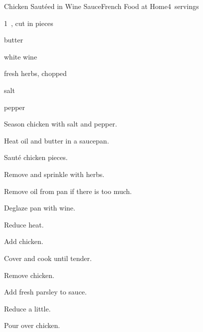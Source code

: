\begin{recipe}{Chicken Sautéed in Wine Sauce}{French Food at Home}{4~servings}

\begin{ingredients}
\item 1~, cut in pieces
\item \C{\quarter} butter
\item \C{\half} white wine
\item {} fresh herbs, chopped
\item salt
\item pepper
\end{ingredients}

\begin{directions}
\item Season chicken with salt and pepper.
\item Heat oil and butter in a saucepan.
\item Sauté chicken pieces.
\item Remove and sprinkle with herbs.
\item Remove oil from pan if there is too much.
\item Deglaze pan with wine.
\item Reduce heat.
\item Add chicken.
\item Cover and cook until tender.
\item Remove chicken.
\item Add fresh parsley to sauce.
\item Reduce a little.
\item Pour over chicken.
\end{directions}

\end{recipe}
